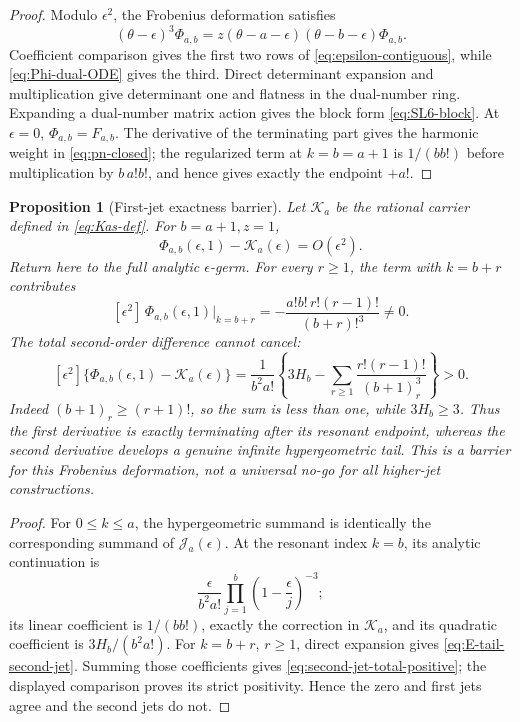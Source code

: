 \documentclass[11pt]{article}
\theoremstyle{keio}
\newtheorem{proposition}[theorem]{Proposition}
\theoremstyle{definition}
\theoremstyle{remark}
\begin{document}
\begin{proof}
Modulo \(\epsilon^2\), the Frobenius deformation satisfies
\begin{equation}\label{eq:Phi-dual-ODE}
 (\theta-\epsilon)^3\Phi_{a,b}
 =z(\theta-a-\epsilon)(\theta-b-\epsilon)\Phi_{a,b}.
\end{equation}
Coefficient comparison gives the first two rows of
\eqref{eq:epsilon-contiguous}, while \eqref{eq:Phi-dual-ODE} gives the third.
Direct determinant expansion and multiplication give determinant one and
flatness in the dual-number ring.  Expanding a
dual-number matrix action gives the block form \eqref{eq:SL6-block}.
At \(\epsilon=0\), \(\Phi_{a,b}=F_{a,b}\).  The derivative of the terminating
part gives the harmonic weight in \eqref{eq:pn-closed}; the regularized term
at \(k=b=a+1\) is \(1/(bb!)\) before multiplication by \(b\,a!b!\), and
hence gives exactly the endpoint \(+a!\).
\end{proof}

\begin{proposition}[First-jet exactness barrier]
\label{prop:first-jet-barrier}
Let \(\mathscr K_a\) be the rational carrier defined in
\eqref{eq:Kas-def}.  For \(b=a+1,z=1\),
\begin{equation}\label{eq:Phi-K-contact}
 \Phi_{a,b}(\epsilon,1)-\mathscr K_a(\epsilon)=O(\epsilon^2).
\end{equation}
Return here to the full analytic \(\epsilon\)-germ.  For every \(r\ge1\),
the term with \(k=b+r\) contributes
\begin{equation}\label{eq:E-tail-second-jet}
 [\epsilon^2]\,\Phi_{a,b}(\epsilon,1)\big|_{k=b+r}
 =-\frac{a!b!\,r!(r-1)!}{(b+r)!^3}\ne0.
\end{equation}
The total second-order difference cannot cancel:
\begin{equation}\label{eq:second-jet-total-positive}
 [\epsilon^2]\{\Phi_{a,b}(\epsilon,1)-\mathscr K_a(\epsilon)\}
 =
 \frac1{b^2a!}\left\{
 3H_b-\sum_{r\ge1}\frac{r!(r-1)!}{(b+1)_r^3}\right\}>0.
\end{equation}
Indeed \((b+1)_r\ge(r+1)!\), so the sum is less than one, while
\(3H_b\ge3\).
Thus the first derivative is exactly terminating after its resonant endpoint,
whereas the second derivative develops a genuine infinite hypergeometric
tail.  This is a barrier for this Frobenius deformation, not a universal
no-go for all higher-jet constructions.
\end{proposition}

\begin{proof}
For \(0\le k\le a\), the hypergeometric summand is identically the
corresponding summand of \(\mathscr J_a(\epsilon)\).  At the resonant index
\(k=b\), its analytic continuation is
\[
 \frac{\epsilon}{b^2a!}
 \prod_{j=1}^b\left(1-\frac{\epsilon}{j}\right)^{-3};
\]
its linear coefficient is \(1/(bb!)\), exactly the correction in
\(\mathscr K_a\), and its quadratic coefficient is
\(3H_b/(b^2a!)\).  For \(k=b+r\), \(r\ge1\), direct expansion gives
\eqref{eq:E-tail-second-jet}.  Summing those coefficients gives
\eqref{eq:second-jet-total-positive}; the displayed comparison proves its
strict positivity.  Hence the zero and first jets agree and the second
jets do not.
\end{proof}
\end{document}
